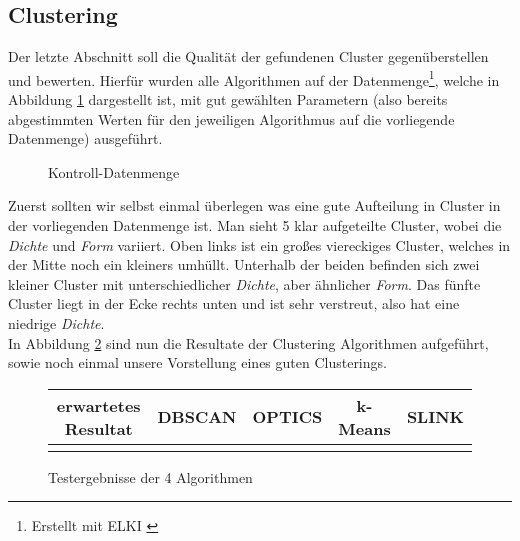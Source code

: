 \documentclass{lni}
\begin{document}

\subsection{Clustering}

Der letzte Abschnitt soll die Qualität der gefundenen Cluster gegenüberstellen und bewerten. Hierfür wurden alle Algorithmen auf der Datenmenge\footnote{Erstellt mit ELKI \cite{ELKI}}, welche in Abbildung \ref{fig:5} dargestellt ist, mit gut gewählten Parametern (also bereits abgestimmten Werten für den jeweiligen Algorithmus auf die vorliegende Datenmenge) ausgeführt.

\begin{figure}[hb]
    \centering
    
    \caption{Kontroll-Datenmenge}
    \label{fig:5}
\end{figure}

Zuerst sollten wir selbst einmal überlegen was eine \glqq gute\grqq{} Aufteilung in Cluster in der vorliegenden Datenmenge ist. Man sieht 5 klar aufgeteilte Cluster, wobei die \textit{Dichte} und \textit{Form} variiert. Oben links ist ein großes viereckiges Cluster, welches in der Mitte noch ein kleiners umhüllt. Unterhalb der beiden befinden sich zwei kleiner Cluster mit unterschiedlicher \textit{Dichte}, aber ähnlicher \textit{Form}. Das fünfte Cluster liegt in der Ecke rechts unten und ist sehr verstreut, also hat eine niedrige \textit{Dichte}.\\
In Abbildung \ref{fig:6} sind nun die Resultate der Clustering Algorithmen aufgeführt, sowie noch einmal unsere Vorstellung eines guten Clusterings.

\begin{figure}
    \centering
    \begin{tabular}{|c|c|c|c|c|}
        \hline
        erwartetes Resultat & DBSCAN & OPTICS & k-Means & SLINK\\
        \hline  
        \raisebox{-\totalheight}{} &
        \raisebox{-\totalheight}{} &
        \raisebox{-\totalheight}{} &
        \raisebox{-\totalheight}{} &
        \raisebox{-\totalheight}{}\\
        \hline
    \end{tabular}
    \caption{Testergebnisse der 4 Algorithmen}
    \label{fig:6}
\end{figure}
\end{document}
